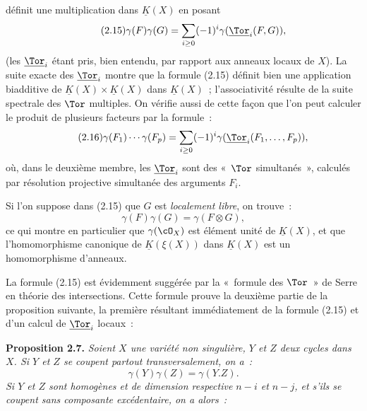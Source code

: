définit une multiplication dans $\underline{K}(X)$ en posant
\begin{equation}\tag{2.15}
 \gamma(F)\gamma(G)=\sum_{i\geq0}(-1)^i\gamma(\underline{\Tor}_i(F,G)),
\end{equation}
(les $\underline{\Tor}_i$ étant pris, bien entendu, par rapport aux anneaux locaux de $X$). La suite exacte des $\underline{\Tor}_i$ montre que la formule (2.15) définit bien une application biadditive de $\underline{K}(X)\times\underline{K}(X)$ dans $\underline{K}(X)$~; l'associativité résulte de la suite spectrale des $\Tor$ multiples. On vérifie aussi de cette façon que l'on peut calculer le produit de plusieurs facteurs par la formule~:
\begin{equation}\tag{2.16}
 \gamma(F_1)\cdots\gamma(F_p)=\sum_{i\geq0}(-1)^i\gamma(\underline{\Tor}_i(F_1,\ldots,F_p)),
\end{equation}
où, dans le deuxième membre, les $\underline{\Tor}_i$ sont des «~$\Tor$ simultanés~», calculés par résolution projective simultanée des arguments $F_i$.

Si l'on suppose dans (2.15) que $G$ est \emph{localement libre}, on trouve~:
\begin{equation}\tag{2.15 bis}
 \gamma(F)\gamma(G)=\gamma(F\otimes G),
\end{equation}
ce qui montre en particulier que $\gamma(\cO_X)$ est élément unité de $\underline{K}(X)$, et que l'homomorphisme canonique de $\underline{K}(\xi(X))$ dans $\underline{K}(X)$ est un homomorphisme d'anneaux.

La formule (2.15) est évidemment suggérée par la «~formule des $\Tor$~» de Serre en théorie des intersections. Cette formule prouve la deuxième partie de la proposition suivante, la première résultant immédiatement de la formule (2.15) et d'un calcul de $\underline{\Tor}_i$ locaux~:

\textbf{Proposition 2.7.} \emph{Soient $X$ une variété non singulière, $Y$ et $Z$ deux cycles dans $X$. Si $Y$ et $Z$ se coupent partout transversalement, on a~:}
\begin{equation}\tag{2.17}
 \gamma(Y)\gamma(Z)=\gamma(Y.Z).
\end{equation}
\emph{Si $Y$ et $Z$ sont homogènes et de dimension respective $n-i$ et $n-j$, et s'ils se coupent sans composante excédentaire, on a alors~:}
